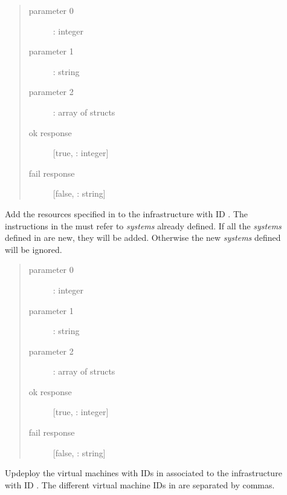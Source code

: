 \documentclass[letterpaper,10pt,english]{sphinxmanual}
\begin{document}
\label{xmlrpc:addresource-xmlrpc}\begin{description}
\item[{}] \leavevmode\begin{quote}\begin{description}
\item[{parameter 0}] \leavevmode
{}: integer

\item[{parameter 1}] \leavevmode
{}: string

\item[{parameter 2}] \leavevmode
{}: array of structs

\item[{ok response}] \leavevmode
{[}true, : integer{]}

\item[{fail response}] \leavevmode
{[}false, : string{]}

\end{description}\end{quote}

Add the resources specified in  to the infrastructure with ID
. The  instructions in the  must refer to
\emph{systems} already defined. If all the \emph{systems} defined in  are
new, they will be added. Otherwise the new \emph{systems} defined will be
ignored.

\item[{}] \leavevmode\begin{quote}\begin{description}
\item[{parameter 0}] \leavevmode
{}: integer

\item[{parameter 1}] \leavevmode
{}: string

\item[{parameter 2}] \leavevmode
{}: array of structs

\item[{ok response}] \leavevmode
{[}true, : integer{]}

\item[{fail response}] \leavevmode
{[}false, : string{]}

\end{description}\end{quote}

Updeploy the virtual machines with IDs in  associated to the
infrastructure with ID . The different virtual machine IDs in
 are separated by commas.

\end{description}
\end{document}

